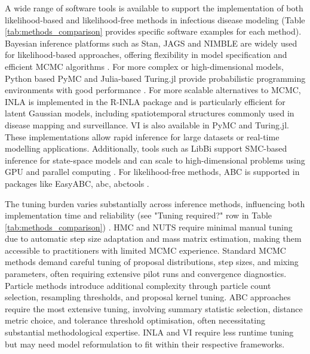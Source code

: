 \documentclass{article}
\begin{document}
A wide range of software tools is available to support the implementation of both likelihood-based and likelihood-free methods in infectious disease modeling (Table \ref{tab:methods_comparison} provides specific software examples for each method). Bayesian inference platforms such as Stan, JAGS and NIMBLE are widely used for likelihood-based approaches, offering flexibility in model specification and efficient MCMC algorithms \citep{carpenter2017stan,abril2023pymc}. For more complex or high-dimensional models, Python based PyMC and Julia-based Turing.jl provide probabilistic programming environments with good performance \citep{abril2023pymc,ge2018turing,fjelde2025turing}. For more scalable alternatives to MCMC, INLA is implemented in the R-INLA package \citep{martins2013bayesian} and is particularly efficient for latent Gaussian models, including spatiotemporal structures commonly used in disease mapping and surveillance. VI is also available in PyMC and Turing.jl. These implementations allow rapid inference for large datasets or real-time modelling applications.  Additionally, tools such as LibBi support SMC-based inference for state-space models and can scale to high-dimensional problems using GPU and parallel computing \citep{murray2015bayesian}. For likelihood-free methods, ABC is supported in packages like EasyABC, abc, abctools \citep{jabot2013easy,csillery2012abc,nunes2015abctools}.

The tuning burden varies substantially across inference methods, influencing both implementation time and reliability (see "Tuning required?" row in Table \ref{tab:methods_comparison}) \citep{funk2020choices}.
HMC and NUTS require minimal manual tuning due to automatic step size adaptation and mass matrix estimation, making them accessible to practitioners with limited MCMC experience.
Standard MCMC methods demand careful tuning of proposal distributions, step sizes, and mixing parameters, often requiring extensive pilot runs and convergence diagnostics.
Particle methods introduce additional complexity through particle count selection, resampling thresholds, and proposal kernel tuning.
ABC approaches require the most extensive tuning, involving summary statistic selection, distance metric choice, and tolerance threshold optimisation, often necessitating substantial methodological expertise.
INLA and VI require less runtime tuning but may need model reformulation to fit within their respective frameworks.
\end{document}
